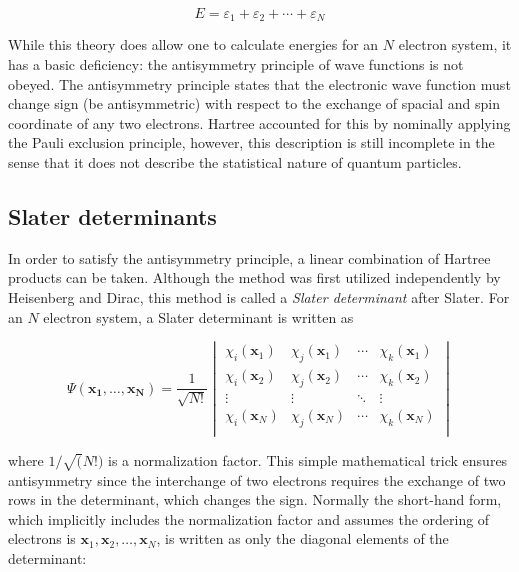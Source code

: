 \begin{equation}
E = \varepsilon_1 + \varepsilon_2 + \cdots + \varepsilon_N
\end{equation}

While this theory does allow one to calculate energies for an $N$ electron system, it has a basic deficiency: the antisymmetry principle of wave functions is not obeyed. The antisymmetry principle states that the electronic wave function must change sign (be antisymmetric) with respect to the exchange of spacial and spin coordinate of any two electrons. Hartree accounted for this by nominally applying the Pauli exclusion principle, however, this description is still incomplete in the sense that it does not describe the statistical nature of quantum particles.

\subsection{Slater determinants}

In order to satisfy the antisymmetry principle, a linear combination of Hartree products can be taken. Although the method was first utilized independently by Heisenberg\cite{Heisenberg1926} and Dirac,\cite{Dirac1926} this method is called a \emph{Slater determinant} after Slater.\cite{Slater1929} For an $N$ electron system, a Slater determinant is written as

\begin{equation}
\Psi(\mathbf{x_1},\ldots,\mathbf{x_N}) = \frac{1}{\sqrt{N!}}
\begin{vmatrix}
\chi_i(\mathbf{x}_1) & \chi_j(\mathbf{x}_1) & \cdots & \chi_k(\mathbf{x}_1) \\
\chi_i(\mathbf{x}_2) & \chi_j(\mathbf{x}_2) & \cdots & \chi_k(\mathbf{x}_2) \\
\vdots & \vdots & \ddots & \vdots \\
\chi_i(\mathbf{x}_N) & \chi_j(\mathbf{x}_N) & \cdots & \chi_k(\mathbf{x}_N) \\
\end{vmatrix}
\end{equation}

\noindent where $1/\sqrt(N!)$ is a normalization factor. This simple mathematical trick ensures antisymmetry since the interchange of two electrons requires the exchange of two rows in the determinant, which changes the sign. Normally the short-hand form, which implicitly includes the normalization factor and assumes the ordering of electrons is $\mathbf{x}_1,\mathbf{x}_2,\dots,\mathbf{x}_N$, is written as only the diagonal elements of the determinant:

